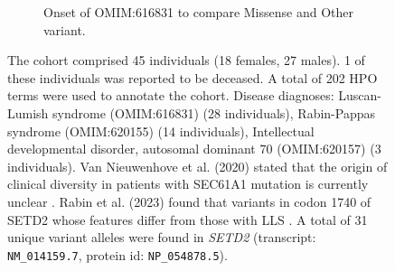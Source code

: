 \begin{figure}[htbp]
\begin{subfigure}[b]{0.95\textwidth}
\captionsetup{justification=raggedright,singlelinecheck=false}
\caption{Onset of OMIM:616831 to compare Missense and Other variant. }
\end{subfigure}

\caption{The cohort comprised 45 individuals (18 females, 27 males). 1 of these individuals was reported to be deceased. 
A total of 202 HPO terms were used to annotate the cohort. 
Disease diagnoses: Luscan-Lumish syndrome (OMIM:616831) (28 individuals), 
Rabin-Pappas syndrome (OMIM:620155) (14 individuals), 
Intellectual developmental disorder, autosomal dominant 70 (OMIM:620157) (3 individuals). 
Van Nieuwenhove et al. (2020) stated that 
the origin of clinical diversity in patients with SEC61A1 mutation is currently unclear \cite{PMID_32325141}. 
Rabin et al. (2023) found that variants in codon 1740 of SETD2 whose features differ from those with LLS \cite{PMID_32710489}.
A total of 31 unique variant alleles were found in \textit{SETD2} (transcript: \texttt{NM\_014159.7}, protein id: \texttt{NP\_054878.5}).}
\end{figure}
